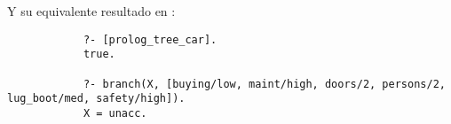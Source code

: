 \begin{itemize}
\begin{solution}
        Y su equivalente resultado en :
        \begin{verbatim}
            ?- [prolog_tree_car].
            true.

            ?- branch(X, [buying/low, maint/high, doors/2, persons/2, lug_boot/med, safety/high]).
            X = unacc.
        \end{verbatim}
    \end{solution}
\end{itemize}




\nocite{*}



